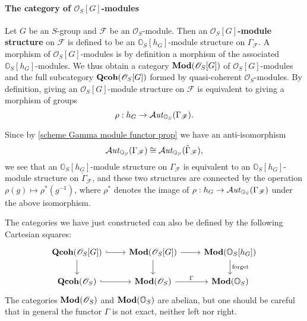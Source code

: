 \paragraph{The category of \texorpdfstring{$\mathscr{O}_S[G]$}{O}-modules}
Let $G$ be an $S$-group and $\mathscr{F}$ be an $\mathscr{O}_S$-module. Then an \textbf{$\mathscr{O}_S[G]$-module structure} on $\mathscr{F}$ is defined to be an $\mathbb{O}_S[h_G]$-module structure on $\Gamma_\mathscr{F}$. A morphism of $\mathscr{O}_S[G]$-modules is by definition a morphism of the associated $\mathbb{O}_S[h_G]$-modules. We thus obtain a category $\mathbf{Mod}(\mathscr{O}_S[G])$ of $\mathscr{O}_S[G]$-modules and the full subcategory $\mathbf{Qcoh}(\mathscr{O}_S[G])$ formed by quasi-coherent $\mathscr{O}_S$-modules. By definition, giving an $\mathscr{O}_S[G]$-module structure on $\mathscr{F}$ is equivalent to giving a morphism of groups
\[\rho:h_G\to\operatorname{\mathcal{A}\hspace*{-0.2pt}\textit{ut}\hspace{0.5pt}}_{\mathbb{O}_S}(\Gamma_\mathscr{F}).\]

\begin{remark}
Since by \cref{scheme Gamma module functor prop} we have an anti-isomorphism
\[\operatorname{\mathcal{A}\hspace*{-0.2pt}\textit{ut}\hspace{0.5pt}}_{\mathbb{O}_S}(\Gamma_\mathscr{F})\cong\operatorname{\mathcal{A}\hspace*{-0.2pt}\textit{ut}\hspace{0.5pt}}_{\mathbb{O}_S}(\check{\Gamma}_\mathscr{F}),\]
we see that an $\mathbb{O}_S[h_G]$-module structure on $\Gamma_\mathscr{F}$ is equivalent to an $\mathbb{O}_S[h_G]$-module structure on $\check{\Gamma}_\mathscr{F}$, and these two structures are connected by the operation $\rho(g)\mapsto \rho^*(g^{-1})$, where $\rho^*$ denotes the image of $\rho:h_G\to\operatorname{\mathcal{A}\hspace*{-0.2pt}\textit{ut}\hspace{0.5pt}}_{\mathbb{O}_S}(\Gamma_\mathscr{F})$ under the above isomorphism.
\end{remark}

\begin{remark}
The categories we have just constructed can also be defined by the following Cartesian squares:
\[\begin{tikzcd}
\Qcoh(\mathscr{O}_S[G])\ar[r,hook]\ar[d]&\Mod(\mathscr{O}_S[G])\ar[r]\ar[d]&\Mod(\mathbb{O}_S[h_G])\ar[d,"\text{forget}"]\\
\Qcoh(\mathscr{O}_S)\ar[r,hook]&\Mod(\mathscr{O}_S)\ar[r,"\Gamma"]&\Mod(\mathbb{O}_S)
\end{tikzcd}\]
The categories $\mathbf{Mod}(\mathscr{O}_S)$ and $\mathbf{Mod}(\mathbb{O}_S)$ are abelian, but one should be careful that in general the functor $\Gamma$ is not exact, neither left nor right.
\end{remark}

